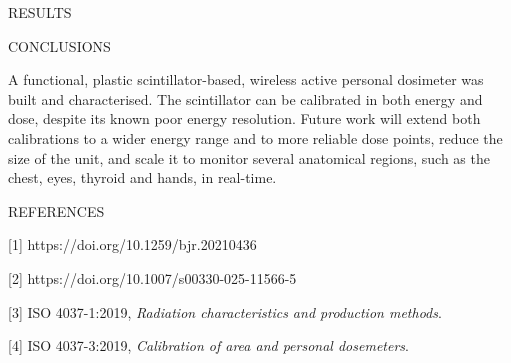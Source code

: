 \documentclass{article}
\newcommand{\conclfont}   {\fontsize{32}{38}\selectfont}   %
\newcommand{\reffont}     {\fontsize{27}{25}\selectfont}   %
\newlength{\colgap}\setlength{\colgap}{1.6cm}           %
\newlength{\colR} \setlength{\colR}{\textwidth}
\newlength{\colWide}\setlength{\colWide}{\colR}
\newlength{\colNarrow}\setlength{\colNarrow}{0.3333\colWide}
\newlength{\rowgap}   \setlength{\rowgap}{1.6cm}     %
\newlength{\rowtwohgt}\setlength{\rowtwohgt}{\textheight}
\newlength{\bothgt} \setlength{\bothgt}{8cm}
\newlength{\reshgt} \setlength{\reshgt}{\rowtwohgt}
\newlength{\resfrmhgt}\setlength{\resfrmhgt}{\reshgt}
\newcommand{\topcol}{\vspace{0pt}}
\newcommand{\blockgap}{\par\nointerlineskip\vspace{\rowgap}}
\begin{document}
\begin{minipage}[t]{\colR}
\begin{dorisection}[height=\resfrmhgt]{RESULTS}
  \end{dorisection}

  \blockgap

  \noindent
  \begin{minipage}[t]{\colWide}\topcol
    \begin{doriblock}[height=\bothgt, slimtitle]{CONCLUSIONS}
      \conclfont

          A functional, plastic scintillator-based, wireless active personal dosimeter was built and
      characterised. The scintillator can be calibrated in both energy and dose, despite its known poor energy resolution. Future work will
      extend both calibrations to a wider energy range and to more reliable
      dose points, reduce the size of the unit, and scale it to monitor several
      anatomical regions, such as the chest, eyes, thyroid and hands, in real-time.
    \end{doriblock}
  \end{minipage}%
  \hspace{\colgap}%
  \begin{minipage}[t]{\colNarrow}\topcol
    \begin{doriblock}[height=\bothgt, slimtitle]{REFERENCES}
      \reffont\setlength{\parskip}{2mm}

      [1] https://doi.org/10.1259/bjr.20210436

      [2] https://doi.org/10.1007/s00330-025-11566-5

      [3] ISO 4037-1:2019, \emph{Radiation characteristics and production
      methods}.

      [4] ISO 4037-3:2019, \emph{Calibration of area and personal dosemeters}.

    \end{doriblock}
  \end{minipage}

\end{minipage}
\end{document}
